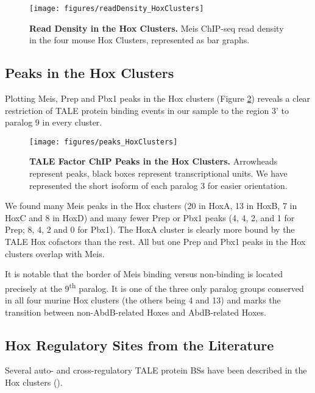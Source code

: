 \begin{figure}[]
  \centering
  \texttt{[image: figures/readDensity\_HoxClusters]}
  \caption[Read Density in the Hox Clusters]{\textbf{Read Density in the Hox Clusters.} Meis ChIP-seq read density in the four mouse Hox Clusters, represented as bar graphs.}
  \label{fig:readDensity}
\end{figure}

\subsection{Peaks in the Hox Clusters}

Plotting Meis, Prep and Pbx1 peaks in the Hox clusters (Figure \ref{fig:peaksClusters}) reveals a clear restriction of \ac{TALE} protein binding events in our sample to the region 3' to paralog 9 in every cluster. 

\begin{figure}[]
  \centering
  \texttt{[image: figures/peaks\_HoxClusters]}
  \caption[TALE Factor ChIP Peaks in the Hox Clusters]{\textbf{TALE Factor ChIP Peaks in the Hox Clusters.} Arrowheads represent peaks, black boxes represent transcriptional units. We have represented the short isoform of each paralog 3 for easier orientation.}
  \label{fig:peaksClusters}
\end{figure}

We found many Meis peaks in the Hox clusters (20 in HoxA, 13 in HoxB, 7 in HoxC and 8 in HoxD) and many fewer Prep or Pbx1 peaks (4, 4, 2, and 1 for Prep; 8, 4, 2 and 0 for Pbx1). The HoxA cluster is clearly more bound by the \ac{TALE} Hox cofactors than the rest. All but one Prep and Pbx1 peaks in the Hox clusters overlap with Meis. 

It is notable that the border of Meis binding versus non-binding is located precisely at the 9\textsuperscript{th} paralog. It is one of the three only paralog groups conserved in all four murine Hox clusters (the others being 4 and 13) and marks the transition between non-AbdB-related Hoxes and AbdB-related Hoxes. 

\subsection{Hox Regulatory Sites from the Literature}

Several auto- and cross-regulatory \ac{TALE} protein \acp{BS} have been described in the Hox clusters (\cite{Lampe2008, Gould1997, Jacobs1999, Manzanares2001, Poepperl1995, Tuempel2007}). 

